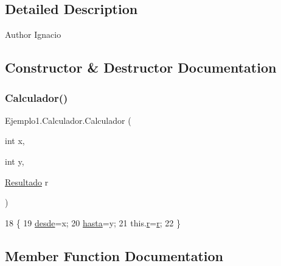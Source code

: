 \subsection{Detailed Description}
\begin{DoxyAuthor}{Author}
Ignacio 
\end{DoxyAuthor}


\subsection{Constructor \& Destructor Documentation}
\mbox{\label{class_ejemplo1_1_1_calculador_a80cde3ae5440c9a6cec72fe788f08f0c}} 
\subsubsection{\texorpdfstring{Calculador()}{Calculador()}}
{\footnotesize\ttfamily Ejemplo1.\+Calculador.\+Calculador (\begin{DoxyParamCaption}\item[{int}]{x,  }\item[{int}]{y,  }\item[{\mbox{\hyperlink{class_ejemplo1_1_1_resultado}{Resultado}}}]{r }\end{DoxyParamCaption})\hspace{0.3cm}{\ttfamily [inline]}}


\begin{DoxyCode}
18     \{
19         \mbox{\hyperlink{class_ejemplo1_1_1_calculador_ae2bd37cb102b858db503e8b30c8f4ae6}{desde}}=x;
20         \mbox{\hyperlink{class_ejemplo1_1_1_calculador_ad47ad2af292db2c559a379ecc3e15f73}{hasta}}=y;
21         this.\mbox{\hyperlink{class_ejemplo1_1_1_calculador_a630ab3c94b10e8ca0483b6ca6a6dc380}{r}}=\mbox{\hyperlink{class_ejemplo1_1_1_calculador_a630ab3c94b10e8ca0483b6ca6a6dc380}{r}};
22     \}
\end{DoxyCode}


\subsection{Member Function Documentation}
\mbox{\label{class_ejemplo1_1_1_calculador_ad9ecfddfb2d7350e2b30ff9bdc4cc97d}} 
